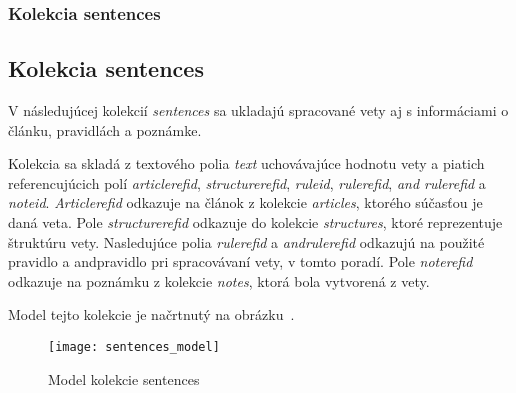 %
%
{
	\subsubsection{Kolekcia sentences}
}
{
	\subsection{Kolekcia sentences}
}
\label{subsubsection:collection_sentences}
V následujúcej kolekcií \textit{sentences} sa ukladajú spracované vety aj s informáciami o článku, pravidlách a poznámke.

Kolekcia sa skladá z textového polia \textit{text} uchovávajúce hodnotu vety a piatich referencujúcich polí \textit{article\textunderscore ref\textunderscore id}, \textit{structure\textunderscore ref\textunderscore id}, \textit{rule\textunderscore id}, \textit{rule\textunderscore ref\textunderscore id}, \textit{and \textunderscore rule\textunderscore ref\textunderscore id} a \textit{note\textunderscore id}. \textit{Article\textunderscore ref\textunderscore id} odkazuje na článok z kolekcie \textit{articles}, ktorého súčasťou je daná veta. Pole \textit{structure\textunderscore ref\textunderscore id} odkazuje do kolekcie \textit{structures}, ktoré reprezentuje štruktúru vety. Nasledujúce polia \textit{rule\textunderscore ref\textunderscore id} a \textit{and\textunderscore rule\textunderscore ref\textunderscore id} odkazujú na použité pravidlo a and\hyph pravidlo pri spracovávaní vety, v tomto poradí. Pole \textit{note\textunderscore ref\textunderscore id} odkazuje na poznámku z kolekcie \textit{notes}, ktorá bola vytvorená z vety.

Model tejto kolekcie je načrtnutý na obrázku~.

\begin{figure}[H]
	\begin{center}\texttt{[image: sentences\_model]}\end{center}
	\caption[Model kolekcie sentences]{Model kolekcie sentences}\label{fig:sentences_collection_model}
\end{figure}

